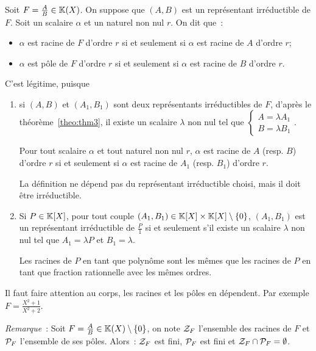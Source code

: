 \begin{defdef}
  Soit \(F=\frac{A}{B} \in \K(X)\). On suppose que \((A,B)\) est un représentant
  irréductible de \(F\). Soit un scalaire \(\alpha\) et un naturel non nul
  \(r\). On dit que~:
  \begin{itemize}
    \item \(\alpha\) est racine de \(F\) d'ordre \(r\) si et seulement si
      \(\alpha\) est racine de \(A\) d'ordre \(r\);
    \item \(\alpha\) est pôle de \(F\) d'ordre \(r\) si et seulement si
      \(\alpha\) est racine de \(B\) d'ordre \(r\).
  \end{itemize}
\end{defdef}

C'est légitime, puisque
\begin{enumerate}
  \item si \((A,B)\) et \((A_1,B_1)\) sont deux représentants irréductibles de
    \(F\), d'après le théorème~\ref{theo:thm3}, il existe un scalaire \(\lambda\) non nul tel que
    \(\begin{cases} A=\lambda A_1 \\ B = \lambda B_1 \end{cases}\).

      Pour tout scalaire \(\alpha\) et tout naturel non nul \(r\), \(\alpha\)
      est racine de \(A\) (resp. \(B\)) d'ordre \(r\) si et seulement si
      \(\alpha\) est racine de \(A_1\) (resp. \(B_1\)) d'ordre \(r\).

      La définition ne dépend pas du représentant irréductible choisi, mais il
      doit être irréductible.
    \item Si \(P \in \K[X]\), pour tout couple \((A_1,B_1) \in \K[X] \times
      \K[X]\setminus\{0\}\), \((A_1,B_1)\) est un représentant irréductible de
      \(\frac{P}{1}\) si et seulement s'il existe un scalaire \(\lambda\) non
      nul tel que \(A_1=\lambda P\) et \(B_1=\lambda\).

      Les racines de \(P\) en tant que polynôme sont les mêmes que les racines
      de \(P\) en tant que fraction rationnelle avec les mêmes ordres.
\end{enumerate}

Il faut faire attention au corps, les racines et les pôles en dépendent. Par
exemple \(F=\frac{X^2+1}{X^2+2}\).

\emph{Remarque}~: Soit \(F=\frac{A}{B} \in \K(X)\setminus\{0\}\), on note
\(\ZZ_F\) l'ensemble des racines de \(F\) et \(\P_F\) l'ensemble de ses pôles.
Alors~: \(\ZZ_F\) est fini, \(\P_F\) est fini et \(\ZZ_F \cap \P_F =\emptyset\).

